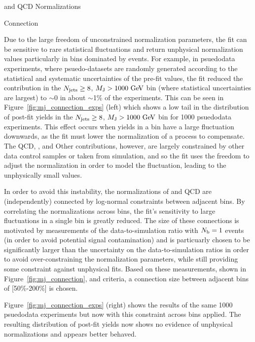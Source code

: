 \begin{section}{\ttbar and QCD Normalizations}
\begin{subsection}{\MJ Connection}
\label{subsec:mj_connection}

Due to the large freedom of unconstrained normalization parameters, the fit can be sensitive to rare statistical fluctuations and return unphysical normalization values particularly in bins dominated by \ttbar events.
For example, in psuedodata experiments, where psuedo-datasets are randomly generated according to the statistical and systematic uncertainties of the pre-fit values, the fit reduced the \ttbar contribution in the $N_{\mathrm{jets}} \geq 8$, $M_{\mathrm{J}} > 1000~\mathrm{Ge\kern -0.1em V}$ bin (where statistical uncertainties are largest) to $\sim$0 in about $\sim$1\% of the experiments.
This can be seen in Figure~\ref{fig:mj_connection_exps} (left) which shows a low tail in the distribution of post-fit \ttbar yields in the $N_{\mathrm{jets}} \geq 8$, $M_{\mathrm{J}} > 1000~\mathrm{Ge\kern -0.1em V}$ bin for 1000 psuedodata experiments.
This effect occurs when yields in a bin have a large fluctuation downwards, as the fit must lower the normalization of a process to compensate.
The QCD, \Wjets, and Other contributions, however, are largely constrained by other data control samples or taken from simulation, and so the fit uses the freedom to adjust the \ttbar normalization in order to model the fluctuation, leading to the unphysically small values.

In order to avoid this instability, the normalizations of \ttbar and QCD are (independently) connected by log-normal constraints between adjacent \MJ bins.
By correlating the normalizations across \MJ bins, the fit's sensitivity to large fluctuations in a single bin is greatly reduced.
The size of these connections is motivated by measurements of the data-to-simulation ratio with $N_{\mathrm{b}} = 1$ events (in order to avoid potential signal contamination) and is particuarly chosen to be significantly larger than the uncertainty on the data-to-simulation ratios in order to avoid over-constraining the normalization parameters, while still providing some constraint against unphysical fits.
Based on these measurements, shown in Figure~\ref{fig:mj_connection}, and criteria, a connection size between adjacent bins of [50\%-200\%] is chosen.

Figure~\ref{fig:mj_connection_exps} (right) shows the results of the same 1000 psuedodata experiments but now with this constraint across \MJ bins applied.
The resulting distribution of post-fit \ttbar yields now shows no evidence of unphysical normalizations and appears better behaved.


\end{subsection}
\end{section}
